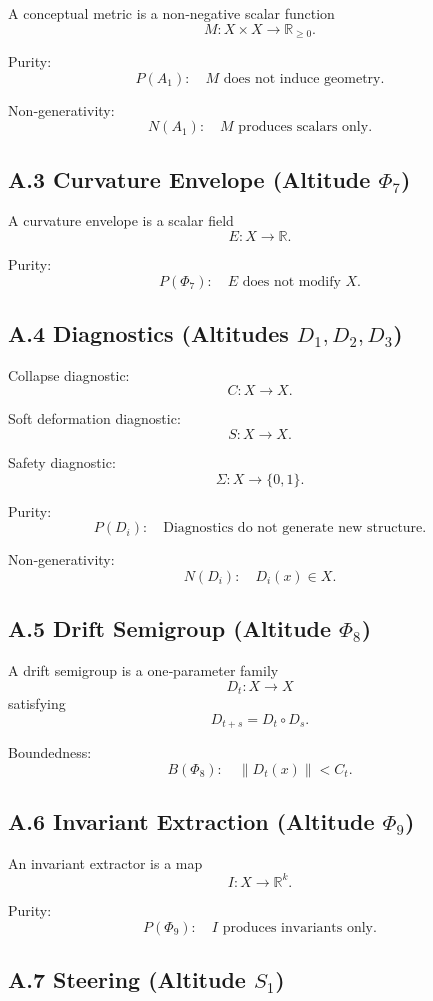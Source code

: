 A conceptual metric is a non‑negative scalar function
\[
M : X \times X \to \mathbb{R}_{\ge 0}.
\]

Purity:
\[
P(A_1):\quad M \text{ does not induce geometry.}
\]

Non‑generativity:
\[
N(A_1):\quad M \text{ produces scalars only.}
\]

\subsection*{A.3 Curvature Envelope (Altitude $\Phi_7$)}

A curvature envelope is a scalar field
\[
E : X \to \mathbb{R}.
\]

Purity:
\[
P(\Phi_7):\quad E \text{ does not modify } X.
\]

\subsection*{A.4 Diagnostics (Altitudes $D_1, D_2, D_3$)}

Collapse diagnostic:
\[
C : X \to X.
\]

Soft deformation diagnostic:
\[
S : X \to X.
\]

Safety diagnostic:
\[
\Sigma : X \to \{0,1\}.
\]

Purity:
\[
P(D_i):\quad \text{Diagnostics do not generate new structure.}
\]

Non‑generativity:
\[
N(D_i):\quad D_i(x) \in X.
\]

\subsection*{A.5 Drift Semigroup (Altitude $\Phi_8$)}

A drift semigroup is a one‑parameter family
\[
D_t : X \to X
\]
satisfying
\[
D_{t+s} = D_t \circ D_s.
\]

Boundedness:
\[
B(\Phi_8):\quad \|D_t(x)\| < C_t.
\]

\subsection*{A.6 Invariant Extraction (Altitude $\Phi_9$)}

An invariant extractor is a map
\[
I : X \to \mathbb{R}^k.
\]

Purity:
\[
P(\Phi_9):\quad I \text{ produces invariants only.}
\]

\subsection*{A.7 Steering (Altitude $S_1$)}

